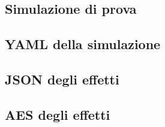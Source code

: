 
\begin{appendices}
    \chapter{Simulazione di prova}\label{app:test}
        \section{YAML della simulazione}\label{app:yaml}
            
            \clearpage

        \section{JSON degli effetti}\label{app:json}
            
            \clearpage

        \section{AES degli effetti}\label{app:aes}
            
\end{appendices}


